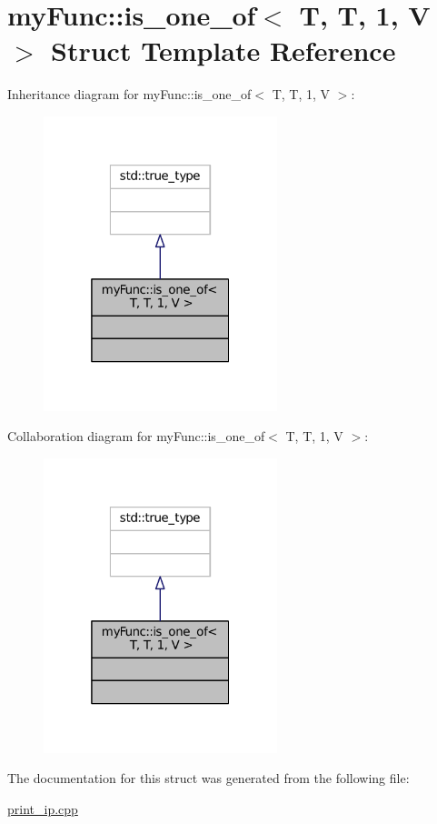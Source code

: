 \hypertarget{structmyFunc_1_1is__one__of_3_01T_00_01T_00_011_00_01V_01_4}{}\section{my\+Func\+:\+:is\+\_\+one\+\_\+of$<$ T, T, 1, V $>$ Struct Template Reference}
\label{structmyFunc_1_1is__one__of_3_01T_00_01T_00_011_00_01V_01_4}


Inheritance diagram for my\+Func\+:\+:is\+\_\+one\+\_\+of$<$ T, T, 1, V $>$\+:
\nopagebreak
\begin{figure}[H]
\begin{center}
\leavevmode
\includegraphics[width=193pt]{structmyFunc_1_1is__one__of_3_01T_00_01T_00_011_00_01V_01_4__inherit__graph}
\end{center}
\end{figure}


Collaboration diagram for my\+Func\+:\+:is\+\_\+one\+\_\+of$<$ T, T, 1, V $>$\+:
\nopagebreak
\begin{figure}[H]
\begin{center}
\leavevmode
\includegraphics[width=193pt]{structmyFunc_1_1is__one__of_3_01T_00_01T_00_011_00_01V_01_4__coll__graph}
\end{center}
\end{figure}


The documentation for this struct was generated from the following file\+:\begin{DoxyCompactItemize}
\item 
\hyperlink{print__ip_8cpp}{print\+\_\+ip.\+cpp}\end{DoxyCompactItemize}
